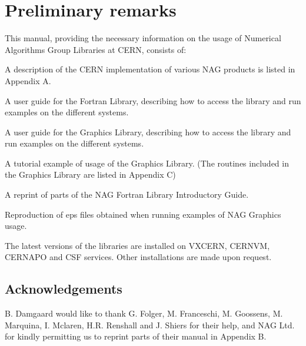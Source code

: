 \def\Rtnr{Front} %
\setcounter{page}{1}
 
 
\newpage
 
\section*{Preliminary remarks}
 
This manual, providing the necessary information on the usage of
Numerical Algorithms Group Libraries at CERN, consists of:
 
\begin{ULc}
\item A description of the CERN implementation of various NAG products
is listed in Appendix A.
\item A user guide for the Fortran Library, describing how to access
the library and run examples on the different systems.
\item A user guide for the Graphics Library, describing how to access
the library and run examples on the different systems.
\item A tutorial example of usage of the Graphics Library. (The routines
included in the Graphics Library are listed in Appendix C)
\item A reprint of parts of the NAG Fortran Library Introductory Guide.
\item Reproduction of eps files obtained when running examples of NAG
Graphics usage.
\end{ULc}    
 
The latest versions of the libraries are installed on VXCERN, CERNVM,
CERNAPO and CSF services. Other installations are made upon request.
 
\begin{center}
\end{center}
 
\subsection*{Acknowledgements}
B. Damgaard
would like to thank G. Folger, M. Franceschi, M. Goossens, M. Marquina,
I. Mclaren, H.R. Renshall and J. Shiers for their help,
and NAG Ltd. for kindly permitting us to reprint
parts of their manual in Appendix B.
 
